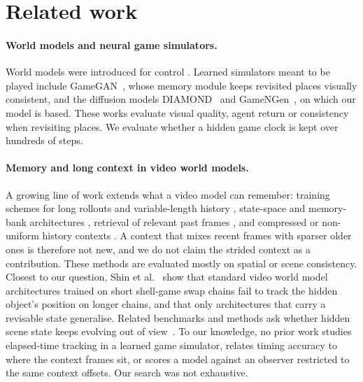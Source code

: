 \documentclass[11pt]{article}
\begin{document}
\section{Related work}
\label{sec:related}
\paragraph{World models and neural game simulators.} World models were introduced for control
\cite{ha2018worldmodels,kaiser2019simple,hafner2023dreamerv3,micheli2023iris}. Learned simulators meant to be played
include GameGAN~\cite{kim2020gamegan}, whose memory module keeps revisited places visually consistent, and the
diffusion models DIAMOND~\cite{alonso2024diamond} and GameNGen~\cite{valevski2024gamengen}, on which our model is
based. These works evaluate visual quality, agent return or consistency when revisiting places. We evaluate whether
a hidden game clock is kept over hundreds of steps.

\paragraph{Memory and long context in video world models.} A growing line of work extends what a video model can
remember: training schemes for long rollouts and variable-length history
\cite{chen2024diffusionforcing,song2025history}, state-space and memory-bank architectures
\cite{po2025longcontext,xiao2025worldmem,lee2025edeline,savov2025statespacediffuser}, retrieval of relevant past frames
\cite{yu2025contextmemory,chen2025vrag}, and compressed or non-uniform history contexts
\cite{zhang2025framepack,gu2025far}. A context that mixes recent frames with sparser older ones is therefore not
new, and we do not claim the strided context as a contribution. These methods are evaluated mostly on spatial or
scene consistency. Closest to our question, Shin et al.~\cite{shin2026unobserved} show that standard video world
model architectures trained on short shell-game swap chains fail to track the hidden object's position on longer
chains, and that only architectures that carry a revisable state generalise. Related benchmarks and methods ask
whether hidden scene state keeps evolving out of view~\cite{ma2026stevo,duan2026liveworld}. To our knowledge, no
prior work studies elapsed-time tracking in a learned game simulator, relates timing accuracy to where the context
frames sit, or scores a model against an observer restricted to the same context offsets. Our search was not
exhaustive.
\end{document}
